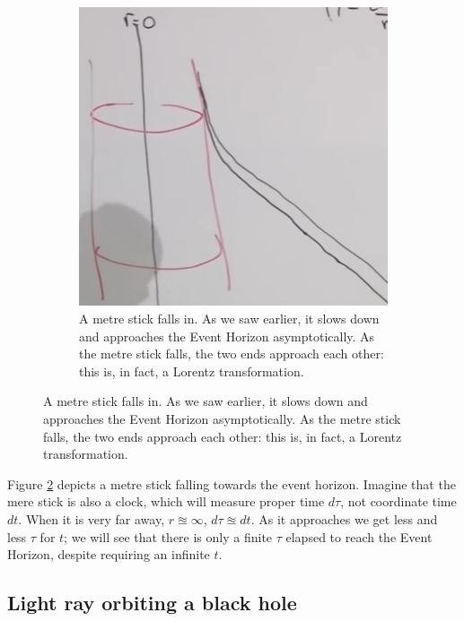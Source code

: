 \documentclass[]{article}
\begin{document}
{\begin{figure}[H]
\begin{center}
\begin{subfigure}[t]{0.45\textwidth}
		\end{subfigure}
		\begin{subfigure}[t]{0.45\textwidth}
			\caption{A metre stick falls in. As we saw earlier, it slows down and approaches the Event Horizon asymptotically. As the metre stick falls, the two ends approach each other: this is, in fact, a Lorentz transformation.}\label{fig:gr-6-infalling}
			\includegraphics[width=\textwidth]{gr-6-infalling}
		\end{subfigure}
	\end{center}
\end{figure}

Figure \ref{fig:gr-6-infalling} depicts a metre stick falling towards the event horizon. Imagine that the mere stick is also a clock, which will measure proper time $d\tau$, not coordinate time $dt$. When it is very far away, $r\approxeq\infty$, $d\tau\approxeq dt$. As it approaches we get less and less $\tau$ for $t$; we will see that there is only a finite $\tau$ elapsed to reach the Event Horizon, despite requiring an infinite $t$.


\subsection{Light ray orbiting a black hole}

}
\end{document}

